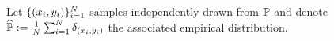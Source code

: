   
 

Let $\{(x_i,y_i)\}_{i=1}^N$ samples independently drawn from $\mathbb{P}$ and denote  $\widehat{\mathbb
{P}}:=\frac{1}{N}\sum_{i=1}^N \delta_{(x_i,y_i)}$ the associated empirical distribution. %
